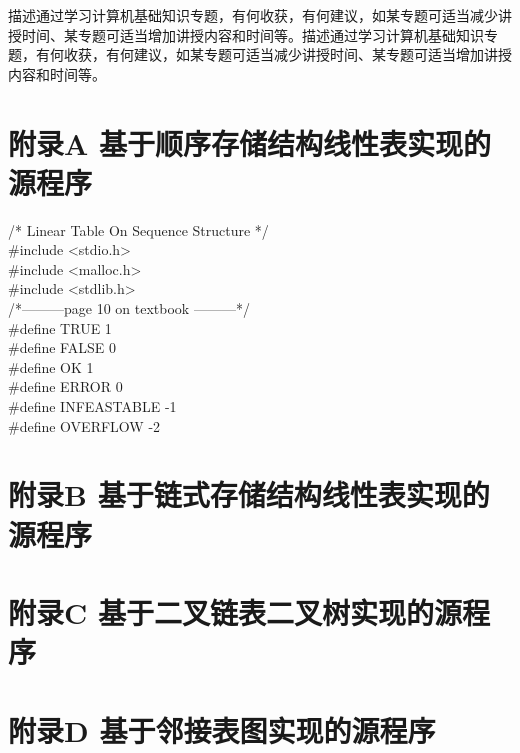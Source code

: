 \documentclass[supercite]{Experimental_Report}
\theoremstyle{definition}
\begin{document}
描述通过学习计算机基础知识专题，有何收获，有何建议，如某专题可适当减少讲授时间、某专题可适当增加讲授内容和时间等。描述通过学习计算机基础知识专题，有何收获，有何建议，如某专题可适当减少讲授时间、某专题可适当增加讲授内容和时间等。


\nocite{*} %



\setcounter{secnumdepth}{0}
\appendix

\section{附录A 基于顺序存储结构线性表实现的源程序}

\noindent
/* Linear Table On Sequence Structure */\\
\#include <stdio.h>\\
\#include <malloc.h>\\
\#include <stdlib.h>\\

\noindent
/*---------page 10 on textbook ---------*/\\
\#define TRUE 1\\
\#define FALSE 0\\
\#define OK 1\\
\#define ERROR 0\\
\#define INFEASTABLE -1\\
\#define OVERFLOW -2\\
\newpage
\section{附录B 基于链式存储结构线性表实现的源程序}
\newpage
\section{附录C 基于二叉链表二叉树实现的源程序}
\newpage
\section{附录D 基于邻接表图实现的源程序}
\end{document}
